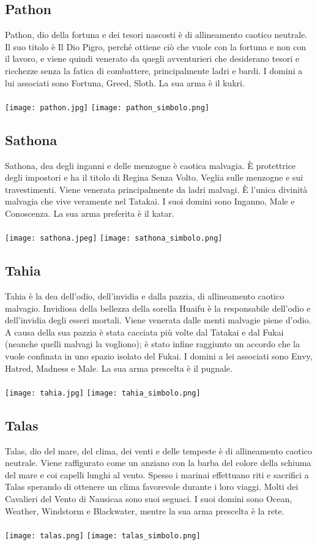 \documentclass[a4paper]{report}
\begin{document}
\begin{multicols}{2}
\subsection*{Pathon}
Pathon, dio della fortuna e dei tesori nascosti è di allineamento caotico neutrale. Il suo titolo è Il Dio Pigro, perché ottiene ciò che vuole con la fortuna e non con il lavoro, e viene quindi venerato da quegli avventurieri che desiderano tesori e ricchezze senza la fatica di combattere, principalmente ladri e bardi. I domini a lui associati sono Fortuna, Greed, Sloth. La sua arma è il kukri.\\
\\
\texttt{[image: pathon.jpg]}
\texttt{[image: pathon\_simbolo.png]}
\subsection*{Sathona}
Sathona, dea degli inganni e delle menzogne è caotica malvagia. È protettrice degli impostori e ha il titolo di Regina Senza Volto. Veglia sulle menzogne e sui travestimenti. Viene venerata principalmente da ladri malvagi. È l'unica divinità malvagia che vive veramente nel Tatakai. I suoi domini sono Inganno, Male e Conoscenza. La sua arma preferita è il katar.\\
\\
\texttt{[image: sathona.jpeg]}
\texttt{[image: sathona\_simbolo.png]}
\subsection*{Tahia}
Tahia è la dea dell'odio, dell'invidia e dalla pazzia, di allineamento caotico malvagio. Invidiosa della bellezza della sorella Huaifu è la responsabile dell'odio e dell'invidia degli esseri mortali. Viene venerata dalle menti malvagie piene d'odio. A causa della sua pazzia è stata cacciata più volte dal Tatakai e dal Fukai (neanche quelli malvagi la vogliono); è stato infine raggiunto un accordo che la vuole confinata in uno spazio isolato del Fukai. I domini a lei associati sono Envy, Hatred, Madness e Male.
La sua arma prescelta è il pugnale.\\
\\
\texttt{[image: tahia.jpg]}
\texttt{[image: tahia\_simbolo.png]}
\subsection*{Talas}
Talas, dio del mare, del clima, dei venti e delle tempeste è di allineamento caotico neutrale. Viene raffigurato come un anziano con la barba del colore della schiuma del mare e coi capelli lunghi al vento. Spesso i marinai effettuano riti e sacrifici a Talas sperando di ottenere un clima favorevole durante i loro viaggi. Molti dei Cavalieri del Vento di Nausicaa sono suoi seguaci.
I suoi domini sono Ocean, Weather, Windstorm e Blackwater, mentre la sua arma prescelta è la rete.\\
\\
\texttt{[image: talas.png]}
\texttt{[image: talas\_simbolo.png]}\\

\end{multicols}
\end{document}
